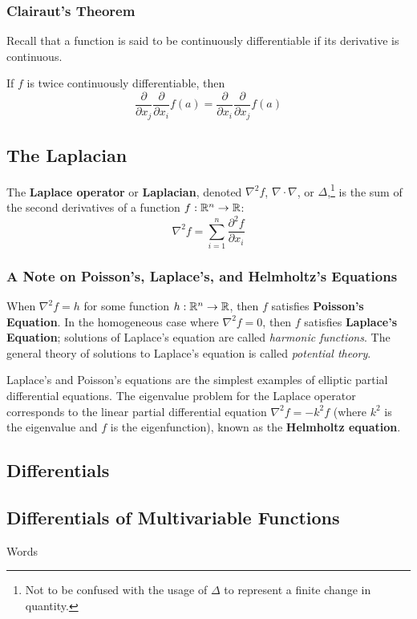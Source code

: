 \subsubsection{Clairaut's Theorem}

Recall that a function is said to be continuously differentiable if its derivative is continuous.

 If $f$ is twice continuously differentiable, then $$\frac{\partial}{\partial x_j}\frac{\partial}{\partial x_i} f(a) = \frac{\partial}{\partial x_i}\frac{\partial}{\partial x_j} f(a)$$

\subsection{The Laplacian}

The \textbf{Laplace operator} or \textbf{Laplacian}, denoted $\nabla^2 f$, $\nabla \cdot \nabla$, or $\Delta$,\footnote{Not to be confused with the usage of $\Delta$ to represent a finite change in quantity.} is the sum of the second derivatives of a function $f: \mathbb{R}^n \to \mathbb{R}$: $$\nabla^2 f = \sum_{i = 1}^n \frac{\partial^2 f}{\partial x_i}$$

\subsubsection{A Note on Poisson's, Laplace's, and Helmholtz's Equations}

When $\nabla^2 f = h$ for some function $h: \mathbb{R}^n \to \mathbb{R}$, then $f$ satisfies \textbf{Poisson's Equation}. In the homogeneous case where $\nabla^2 f = 0$, then $f$ satisfies \textbf{Laplace's Equation}; solutions of Laplace's equation are called \textit{harmonic functions}. The general theory of solutions to Laplace's equation is called \textit{potential theory}.

Laplace's and Poisson's equations are the simplest examples of elliptic partial differential equations. The eigenvalue problem for the Laplace operator corresponds to the linear partial differential equation $\nabla^2 f = -k^2 f$ (where $k^2$ is the eigenvalue and $f$ is the eigenfunction), known as the \textbf{Helmholtz equation}.

\subsection{Differentials}

\subsection{Differentials of Multivariable Functions}
Words \pagebreak

